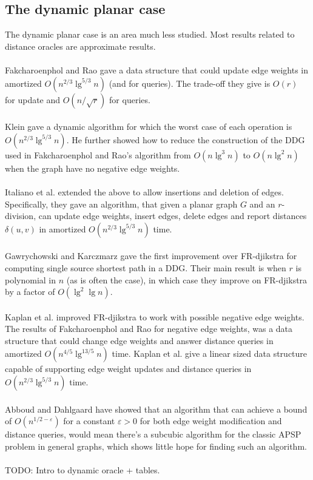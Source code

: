 \subsection{The dynamic planar case}
The dynamic planar case is an area much less studied. Most results related to distance
oracles are approximate results. \\
\\
Fakcharoenphol and Rao \cite{fakcharoenphol2006planar} gave a data structure that could
update edge weights in amortized $O(n^{2/3}\lg^{5/3} n)$ (and for queries). The trade-off
they give is $O(r)$ for update and $O(n/\sqrt{r})$ for queries. \\
\\
Klein \cite{klein2005multiple} gave a dynamic algorithm for which the worst case of each
operation is $O(n^{2/3}\lg^{5/3} n)$. He further showed how to reduce the construction of
the DDG used in Fakcharoenphol and Rao's algorithm from $O(n\lg^3 n)$ to $O(n\lg^2 n)$
when the graph have no negative edge weights. \\
\\
Italiano et al. \cite{italiano2011improved} extended the above to allow insertions and
deletion of edges. Specifically, they gave an algorithm, that given a planar graph $G$
and an $r$-division,
can update edge weights, insert edges, delete edges and report distances $\delta(u,v)$ in amortized $O(n^{2/3}\lg^{5/3}
n)$ time. \\
\\
Gawrychowski and Karczmarz \cite{gawrychowski2016improved} gave the first improvement
over FR-djikstra for computing single source shortest path in a DDG. Their main result is when $r$ is polynomial in $n$ (as is often the
case), in which case they improve on FR-djikstra by a factor of $O(\lg^2 \lg n)$. \\
\\
Kaplan et al. \cite{kaplan2012submatrix} improved FR-djikstra to work with possible
negative edge weights. The results of Fakcharoenphol and Rao for negative edge weights,
was a data structure that could change edge weights and answer distance queries in
amortized $O(n^{4/5}\lg^{13/5} n)$ time. Kaplan et al. give a linear sized data structure capable of supporting edge
weight updates and distance queries in $O(n^{2/3}\lg^{5/3} n)$ time. \\
\\
Abboud and Dahlgaard \cite{abboud2016popular} have showed that an algorithm that can
achieve a bound of $O(n^{1/2-\varepsilon})$ for a constant $\varepsilon>0$ for both edge
weight modification and distance queries, would mean
there's a subcubic algorithm for the classic APSP problem in general graphs, which shows
little hope for finding such an algorithm. \\
\\
TODO: Intro to dynamic oracle + tables.

